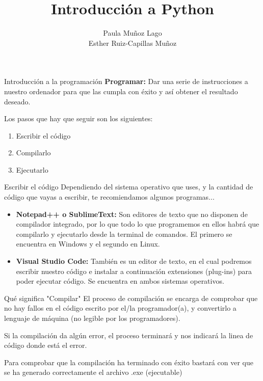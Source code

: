 \documentclass{beamer}
\title{Introducción a Python}
\author{Paula Muñoz Lago \\ Esther Ruiz-Capillas Muñoz}
\institute{Facultad de Informática, UCM}
\begin{document}
    \begin{frame}
        \maketitle
    \end{frame}

    \begin{frame} {Introducción a la programación}
	    \textbf{Programar: } Dar una serie de instrucciones a nuestro ordenador para que las cumpla con éxito y así obtener el resultado deseado.
	    
	    Los pasos que hay que seguir son los siguientes: 
	    \begin{enumerate}
	    	\item Escribir el código
	    	\item Compilarlo
	    	\item Ejecutarlo
	    \end{enumerate}
	\end{frame}

	\begin{frame} {Escribir el código}
		Dependiendo del sistema operativo que uses, y la cantidad de código que vayas a escribir, te recomiendamos algunos programas...
		
		\begin{itemize}
			\item \textbf{Notepad++ o SublimeText:} Son editores de texto que no disponen de compilador integrado, por lo que todo lo que programemos en ellos habrá que compilarlo y ejecutarlo desde la terminal de comandos. El primero se encuentra en Windows y el segundo en Linux.
			\item \textbf{Visual Studio Code: } También es un editor de texto, en el cual podremos escribir nuestro código e instalar a continuación extensiones (plug-ins) para poder ejecutar código. Se encuentra en ambos sistemas operativos.
		\end{itemize}
	\end{frame}

	\begin{frame}{Qué significa "Compilar"}
	\setlength{\parskip}{8mm}
	El proceso de compilación se encarga de comprobar que no hay fallos en el código escrito por el/la programador(a), y convertirlo a lenguaje de máquina (no legible por los programadores).
	
	Si la compilación da algún error, el proceso terminará y nos indicará la linea de código donde está el error.
	
	Para comprobar que la compilación ha terminado con éxito bastará con ver que se ha generado correctamente el archivo .exe (ejecutable)
	\end{frame}
\end{document}
